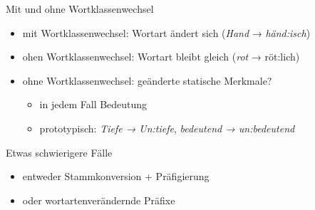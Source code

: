 \begin{frame}
  {Mit und ohne Wortklassenwechsel}
  \pause
  \begin{itemize}[<+->]
    \item mit Wortklassenwechsel: Wortart ändert sich (\textit{Hand} → \textit{händ:isch})
    \item ohen Wortklassenwechsel: Wortart bleibt gleich (\textit{rot} → röt:lich)
      \Zeile
    \item ohne Wortklassenwechsel: geänderte statische Merkmale?
      \begin{itemize}[<+->]
        \item in jedem Fall \alert{Bedeutung}
        \item prototypisch: \textit{Tiefe → Un:tiefe}, \textit{bedeutend → un:bedeutend}
      \end{itemize}
  \end{itemize}
\end{frame}

\begin{frame}
  {Etwas schwierigere Fälle}
  \pause
  \begin{exe}
    \ex
    \begin{xlist}
    \end{xlist}
    \pause
    \ex
    \begin{xlist}
    \end{xlist}
  \end{exe}
  \pause
  \begin{itemize}[<+->]
    \item entweder Stammkonversion + Präfigierung
    \item oder wortartenverändernde Präfixe
  \end{itemize}
\end{frame}

